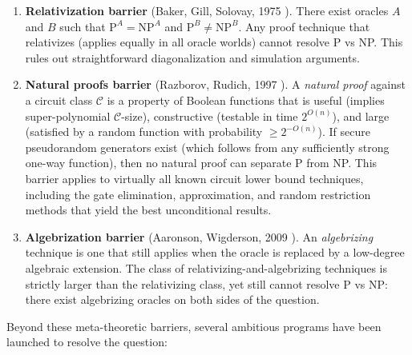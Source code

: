 \documentclass[11pt]{article}
\theoremstyle{definition}
\theoremstyle{remark}
\newcommand{\calC}{\mathcal{C}}
\begin{document}
\begin{enumerate}[label=(\roman*),nosep]
  \item \textbf{Relativization barrier} (Baker, Gill, Solovay, 1975
    \cite{BGS75}).  There exist oracles $A$ and $B$ such that
    $\mathrm{P}^A = \mathrm{NP}^A$ and $\mathrm{P}^B \neq \mathrm{NP}^B$.
    Any proof technique that relativizes (applies equally in all oracle worlds)
    cannot resolve P vs NP.  This rules out straightforward diagonalization
    and simulation arguments.

  \item \textbf{Natural proofs barrier} (Razborov, Rudich, 1997 \cite{RR}).
    A \emph{natural proof} against a circuit class $\calC$ is a property of
    Boolean functions that is useful (implies super-polynomial $\calC$-size),
    constructive (testable in time $2^{O(n)}$), and large (satisfied by a
    random function with probability $\geq 2^{-O(n)}$).  If secure
    pseudorandom generators exist (which follows from any sufficiently strong
    one-way function), then no natural proof can separate P from NP.  This
    barrier applies to virtually all known circuit lower bound techniques,
    including the gate elimination, approximation, and random restriction
    methods that yield the best unconditional results.

  \item \textbf{Algebrization barrier} (Aaronson, Wigderson, 2009
    \cite{AW09}).  An \emph{algebrizing} technique is one that still applies
    when the oracle is replaced by a low-degree algebraic extension.  The
    class of relativizing-and-algebrizing techniques is strictly larger than
    the relativizing class, yet still cannot resolve P vs NP: there exist
    algebrizing oracles on both sides of the question.
\end{enumerate}

\noindent
Beyond these meta-theoretic barriers, several ambitious programs have
been launched to resolve the question:
\end{document}
